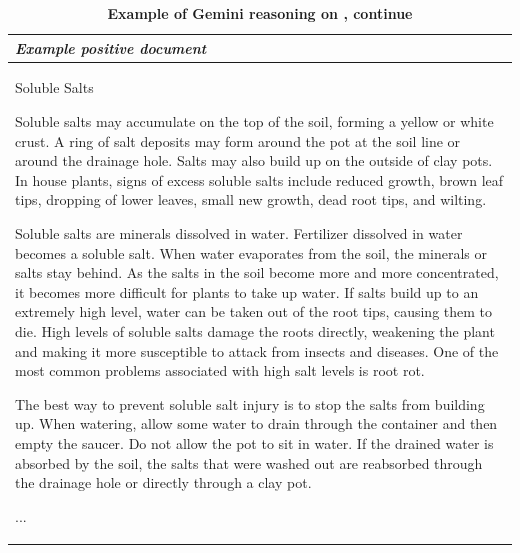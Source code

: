 \begin{table}[ht]
\caption{\textbf{Example of Gemini reasoning on \sustainable, continue}}
\centering

\begin{tabular}{p{13cm}}
\toprule
\textit{\textbf{Example positive document}} \\
\midrule
Soluble Salts

Soluble salts may accumulate on the top of the soil, forming a yellow or white crust. A ring of salt deposits may form around the pot at the soil line or around the drainage hole. Salts may also build up on the outside of clay pots. In house plants, signs of excess soluble salts include reduced growth, brown leaf tips, dropping of lower leaves, small new growth, dead root tips, and wilting.

Soluble salts are minerals dissolved in water. Fertilizer dissolved in water becomes a soluble salt. When water evaporates from the soil, the minerals or salts stay behind. As the salts in the soil become more and more concentrated, it becomes more difficult for plants to take up water. If salts build up to an extremely high level, water can be taken out of the root tips, causing them to die. High levels of soluble salts damage the roots directly, weakening the plant and making it more susceptible to attack from insects and diseases. One of the most common problems associated with high salt levels is root rot.

The best way to prevent soluble salt injury is to stop the salts from building up. When watering, allow some water to drain through the container and then empty the saucer. Do not allow the pot to sit in water. If the drained water is absorbed by the soil, the salts that were washed out are reabsorbed through the drainage hole or directly through a clay pot. 

...\\

\bottomrule
\end{tabular}
\label{tab:example_sustainable_living_reason1}
\end{table}